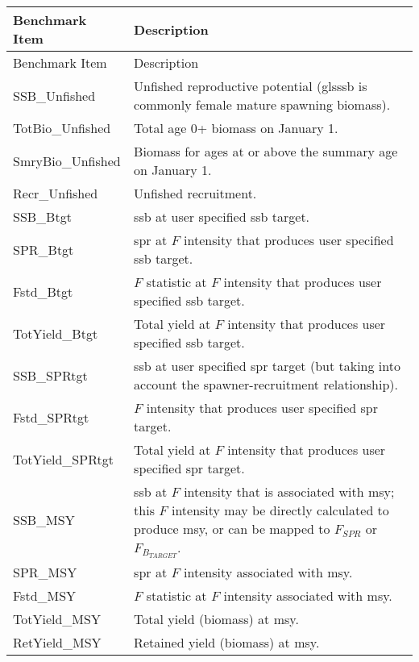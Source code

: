 \begin{center}
	\begin{longtable}{p{4cm} p{11cm}}
		\hline
		Benchmark Item & Description \Tstrut\Bstrut\\
		\hline
		\endfirsthead

		\hline
		Benchmark Item & Description \Tstrut\Bstrut\\
		\hline
		\endhead
		
		\endfoot
		\hline		
		\endlastfoot
		
		SSB\_Unfished \Tstrut & Unfished reproductive potential (gls{ssb} is commonly female mature spawning biomass). \\
		TotBio\_Unfished \Tstrut & Total age 0+ biomass on January 1. \\
		SmryBio\_Unfished \Tstrut & Biomass for ages at or above the summary age on January 1. \\
		Recr\_Unfished \Tstrut & Unfished recruitment. \\
		SSB\_Btgt \Tstrut & \gls{ssb} at user specified \gls{ssb} target. \\
		SPR\_Btgt \Tstrut & \gls{spr} at $F$ intensity that produces user specified \gls{ssb} target. \\
		Fstd\_Btgt \Tstrut & $F$ statistic at $F$ intensity that produces user specified \gls{ssb} target. \\
		TotYield\_Btgt \Tstrut & Total yield at $F$ intensity that produces user specified \gls{ssb} target. \\
		SSB\_SPRtgt \Tstrut & \gls{ssb} at user specified \gls{spr} target (but taking into account the spawner-recruitment relationship). \\
		Fstd\_SPRtgt \Tstrut & $F$ intensity that produces user specified \gls{spr} target. \\
		TotYield\_SPRtgt \Tstrut & Total yield at $F$ intensity that produces user specified \gls{spr} target. \\
		SSB\_MSY \Tstrut & \gls{ssb} at $F$ intensity that is associated with \gls{msy}; this $F$ intensity may be directly calculated to produce \gls{msy}, or can be mapped to $F_{SPR}$ or $F_{B_{TARGET}}$. \\
		SPR\_MSY \Tstrut & \gls{spr} at $F$ intensity associated with \gls{msy}. \\
		Fstd\_MSY \Tstrut & $F$ statistic at $F$ intensity associated with \gls{msy}. \\
		TotYield\_MSY \Tstrut & Total yield (biomass) at \gls{msy}. \\
		RetYield\_MSY \Tstrut & Retained yield (biomass) at \gls{msy}. \Bstrut\\ 
	\end{longtable}
\end{center}

